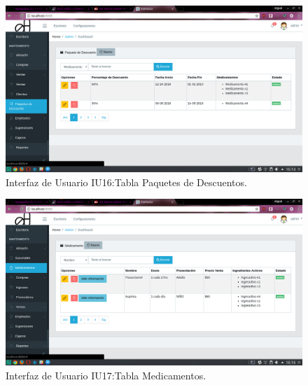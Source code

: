 \begin{figure}[htbp!]
	\begin{center}
\includegraphics[width=\textwidth]{Pantallas/tablaPaquetesDecuento}
		\caption{Interfaz de Usuario IU16:Tabla Paquetes de Descuentos.}
	\end{center}
\end{figure}



\begin{figure}[htbp!]
	\begin{center}
\includegraphics[width=\textwidth]{Pantallas/TablaMedicamentos}
		\caption{Interfaz de Usuario IU17:Tabla Medicamentos.}
	\end{center}
\end{figure}



